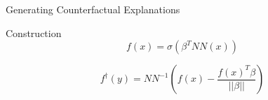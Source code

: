 \begin{frame}[standout]
	Generating Counterfactual Explanations
\end{frame}


\begin{frame}{Construction}
	$$
	f(x) = \sigma \left ( \beta^T NN(x) \right)
	$$

	$$
	f^\dagger(y) = NN^{-1}\left( f(x) - \frac{f(x)^T \beta}{||\beta||}\right)
	$$
\end{frame}
